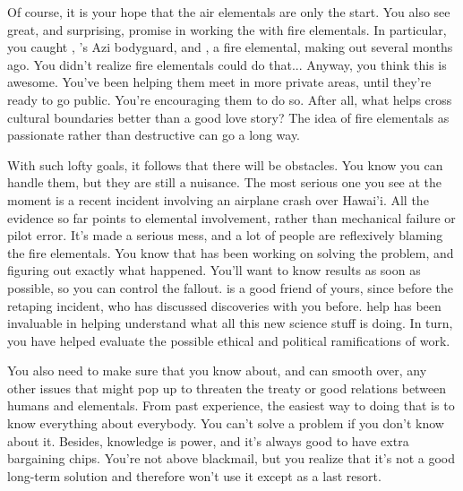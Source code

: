 \documentclass[char]{elementals}
\begin{document}
Of course, it is your hope that the air elementals are only the start.  You also see great, and surprising, promise in working the with fire elementals.  In particular, you caught \cRomeo{\intro}, \cLeader{}'s Azi bodyguard, and \cJuliet{\intro}, a fire elemental, making out several months ago.  You didn't realize fire elementals could do that...  Anyway, you think this is awesome.  You've been helping them meet in more private areas, until they're ready to go public.  You're encouraging them to do so.  After all, what helps cross cultural boundaries better than a good love story?  The idea of fire elementals as passionate rather than destructive can go a long way.

With such lofty goals, it follows that there will be obstacles.  You know you can handle them, but they are still a nuisance.  The most serious one you see at the moment is a recent incident involving an airplane crash over Hawai'i.  All the evidence so far points to elemental involvement, rather than mechanical failure or pilot error.  It's made a serious mess, and a lot of people are reflexively blaming the fire elementals.  You know that \cScientist{\intro} has been working on solving the problem, and figuring out exactly what happened.  You'll want to know \cScientist{\their} results as soon as possible, so you can control the fallout.  \cScientist{} is a good friend of yours, since before the retaping incident, who has discussed \cScientist{\their} discoveries with you before.  \cScientist{\Their} help has been invaluable in helping understand what all this new science stuff is doing.  In turn, you have helped \cScientist{} evaluate the possible ethical and political ramifications of \cScientist{\their} work.


You also need to make sure that you know about, and can smooth over, any other issues that might pop up to threaten the treaty or good relations between humans and elementals.  From past experience, the easiest way to doing that is to know everything about everybody.  You can't solve a problem if you don't know about it.  Besides, knowledge is power, and it's always good to have extra bargaining chips.  You're not above blackmail, but you realize that it's not a good long-term solution and therefore won't use it except as a last resort.
\end{document}
